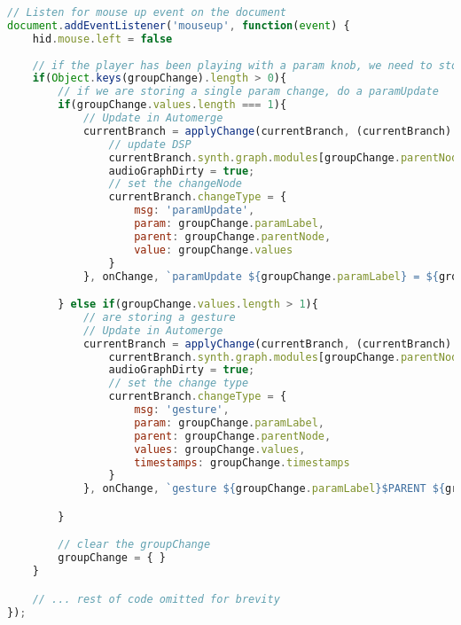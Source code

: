 \begin{lstlisting}[language=JavaScript, caption={Creates a new changeNode, updates the DSP graph, adds both to the patch history. There are many instances of this throughout the synthApp.js, and the method for creating paramUpdate or gesture changeNodes is what is documented here.}, label={lst:applyChange-examples}]
// Listen for mouse up event on the document
document.addEventListener('mouseup', function(event) {
    hid.mouse.left = false
    
    // if the player has been playing with a param knob, we need to store it in automerge
    if(Object.keys(groupChange).length > 0){
        // if we are storing a single param change, do a paramUpdate
        if(groupChange.values.length === 1){
            // Update in Automerge
            currentBranch = applyChange(currentBranch, (currentBranch) => {
                // update DSP
                currentBranch.synth.graph.modules[groupChange.parentNode].params[groupChange.paramLabel] = groupChange.values[0];
                audioGraphDirty = true;
                // set the changeNode
                currentBranch.changeType = {
                    msg: 'paramUpdate',
                    param: groupChange.paramLabel,
                    parent: groupChange.parentNode,
                    value: groupChange.values
                }
            }, onChange, `paramUpdate ${groupChange.paramLabel} = ${groupChange.values[0]}$PARENT ${groupChange.parentNode}`);

        } else if(groupChange.values.length > 1){
            // are storing a gesture
            // Update in Automerge
            currentBranch = applyChange(currentBranch, (currentBranch) => {
                currentBranch.synth.graph.modules[groupChange.parentNode].params[groupChange.paramLabel] = groupChange.values;
                audioGraphDirty = true;
                // set the change type
                currentBranch.changeType = {
                    msg: 'gesture',
                    param: groupChange.paramLabel,
                    parent: groupChange.parentNode,
                    values: groupChange.values,
                    timestamps: groupChange.timestamps
                }
            }, onChange, `gesture ${groupChange.paramLabel}$PARENT ${groupChange.parentNode}`);

        }

        // clear the groupChange
        groupChange = { }
    }

    // ... rest of code omitted for brevity
});

\end{lstlisting}



